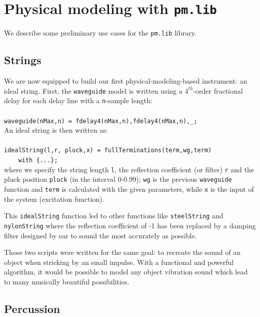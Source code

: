 \documentclass[11pt,a4paper]{article}
\begin{document}
\section{Physical modeling with \texttt{pm.lib}}

We describe some preliminary use cases for the \texttt{pm.lib} library.

\subsection*{Strings}

We are now equipped to build our first physical-modeling-based instrument: an ideal string. First, the \texttt{waveguide} model is written using a $4^{th}$-order fractional delay for each delay line with a \texttt{n}-sample length:\\
\\
\texttt{waveguide(nMax,n) = fdelay4(nMax,n),fdelay4(nMax,n),\_;}\\

An ideal string is then written as:\\
\\
\texttt{idealString(l,r, pluck,x) = fullTerminations(term,wg,term)\\
~~~~with \{...\};	
} \\

\noindent where we specify the string length \texttt{l}, the reflection coefficient (or filter) \texttt{r} and the pluck position \texttt{pluck} (in the interval 0-0.99); \texttt{wg} is the previous \texttt{waveguide} function and \texttt{term} is calculated with the given parameters, while \texttt{x} is the input of the system (excitation function).

This \texttt{idealString} function led to other functions like \texttt{steelString} and \texttt{nylonString} where the reflection coefficient of -1 has been replaced by a damping filter designed by ear to sound the most accurately as possible.


Those two scripts were written  for the same goal: to recreate the sound of an object when stricking by an small impulse. With a functional and powerful algorithm, it would be possible to model any object vibration sound which lead to many musically beautiful possibilities.

\subsection*{Percussion}
\end{document}
